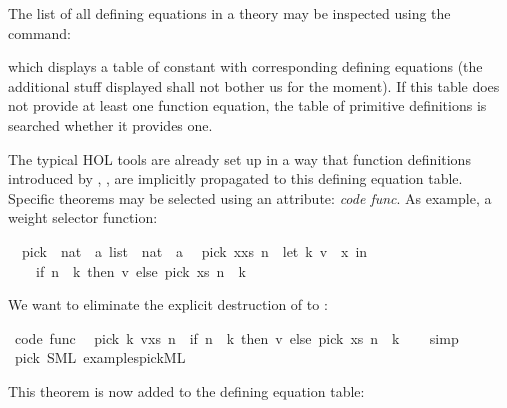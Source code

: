 \begin{isabellebody}
\isamarkuptrue%
%
\begin{isamarkuptext}%
The list of all defining equations in a theory may be inspected
  using the \isa{{\isasymPRINTCODETHMS}} command:%
\end{isamarkuptext}%
\isamarkuptrue%
\isamarkupfalse%
%
\begin{isamarkuptext}%
\noindent which displays a table of constant with corresponding
  defining equations (the additional stuff displayed
  shall not bother us for the moment). If this table does
  not provide at least one function
  equation, the table of primitive definitions is searched
  whether it provides one.

  The typical HOL tools are already set up in a way that
  function definitions introduced by \isa{{\isasymFUN}},
  \isa{{\isasymFUNCTION}}, \isa{{\isasymPRIMREC}}
  \isa{{\isasymRECDEF}} are implicitly propagated
  to this defining equation table. Specific theorems may be
  selected using an attribute: \emph{code func}. As example,
  a weight selector function:%
\end{isamarkuptext}%
\isamarkuptrue%
\isamarkupfalse%
\isanewline
\ \ pick\ {\isacharcolon}{\isacharcolon}\ {\isachardoublequoteopen}{\isacharparenleft}nat\ {\isasymtimes}\ {\isacharprime}a{\isacharparenright}\ list\ {\isasymRightarrow}\ nat\ {\isasymRightarrow}\ {\isacharprime}a{\isachardoublequoteclose}\isanewline
\isanewline
{}\isamarkupfalse%
\isanewline
\ \ {\isachardoublequoteopen}pick\ {\isacharparenleft}x{\isacharhash}xs{\isacharparenright}\ n\ {\isacharequal}\ {\isacharparenleft}let\ {\isacharparenleft}k{\isacharcomma}\ v{\isacharparenright}\ {\isacharequal}\ x\ in\isanewline
\ \ \ \ if\ n\ {\isacharless}\ k\ then\ v\ else\ pick\ xs\ {\isacharparenleft}n\ {\isacharminus}\ k{\isacharparenright}{\isacharparenright}{\isachardoublequoteclose}%
\begin{isamarkuptext}%
We want to eliminate the explicit destruction
  of  to :%
\end{isamarkuptext}%
\isamarkuptrue%
\isamarkupfalse%
\ {\isacharbrackleft}code\ func{\isacharbrackright}{\isacharcolon}\isanewline
\ \ {\isachardoublequoteopen}pick\ {\isacharparenleft}{\isacharparenleft}k{\isacharcomma}\ v{\isacharparenright}{\isacharhash}xs{\isacharparenright}\ n\ {\isacharequal}\ {\isacharparenleft}if\ n\ {\isacharless}\ k\ then\ v\ else\ pick\ xs\ {\isacharparenleft}n\ {\isacharminus}\ k{\isacharparenright}{\isacharparenright}{\isachardoublequoteclose}\isanewline
%
\isadelimproof
\ \ %
\endisadelimproof
%
\isatagproof
{}\isamarkupfalse%
\ simp%
\endisatagproof
{\isafoldproof}%
%
\isadelimproof
\isanewline
%
\endisadelimproof
\isanewline
{}\isamarkupfalse%
\ pick\ {\isacharparenleft}SML\ {\isachardoublequoteopen}examples{\isacharslash}pick{}{\isachardot}ML{\isachardoublequoteclose}{\isacharparenright}%
\begin{isamarkuptext}%
This theorem is now added to the defining equation table:


\end{isamarkuptext}
\end{isabellebody}
